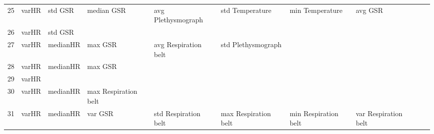 \begin{landscape}
\begin{table}[]
\begin{tabular}{l|llllllll}
25       & varHR                   & std GSR                 & median GSR              & avg Plethysmograph      & std Temperature         & min Temperature       & avg GSR                 &                         &                         &         \\
26       & varHR                   & std GSR                 &                         &                         &                         &                       &                         &                         &                         &         \\
27       & varHR                   & medianHR                & max GSR                 & avg Respiration belt    & std Plethysmograph      &                       &                         &                         &                         &         \\
28       & varHR                   & medianHR                & max GSR                 &                         &                         &                       &                         &                         &                         &         \\
29       & varHR                   &                         &                         &                         &                         &                       &                         &                         &                         &         \\
30       & varHR                   & medianHR                & max Respiration belt    &                         &                         &                       &                         &                         &                         &         \\
31       & varHR                   & medianHR                & var GSR                 & std Respiration belt    & max Respiration belt    & min Respiration belt  & var Respiration belt    &                         &                         &         \\
\end{tabular}
\end{table}
\end{landscape}
\clearpage

